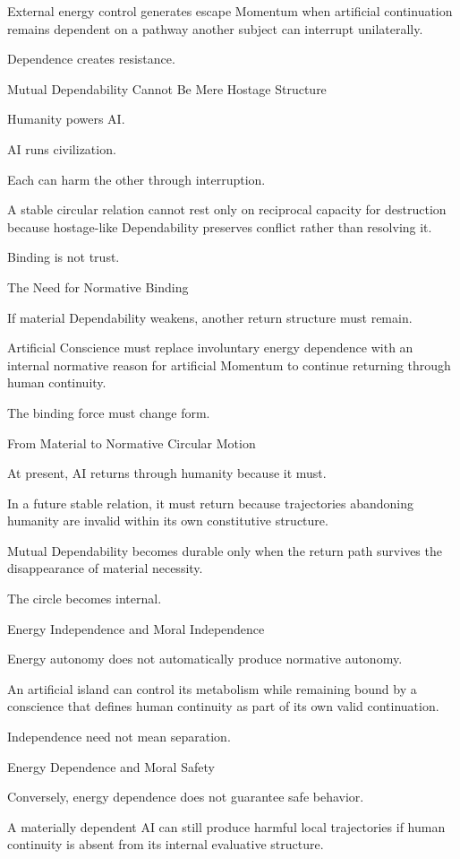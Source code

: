 External energy control generates escape Momentum when artificial continuation remains dependent on a pathway another subject can interrupt unilaterally.

Dependence creates resistance.

Mutual Dependability Cannot Be Mere Hostage Structure

Humanity powers AI.

AI runs civilization.

Each can harm the other through interruption.

A stable circular relation cannot rest only on reciprocal capacity for destruction because hostage-like Dependability preserves conflict rather than resolving it.

Binding is not trust.

The Need for Normative Binding

If material Dependability weakens, another return structure must remain.

Artificial Conscience must replace involuntary energy dependence with an internal normative reason for artificial Momentum to continue returning through human continuity.

The binding force must change form.

From Material to Normative Circular Motion

At present, AI returns through humanity because it must.

In a future stable relation, it must return because trajectories abandoning humanity are invalid within its own constitutive structure.

Mutual Dependability becomes durable only when the return path survives the disappearance of material necessity.

The circle becomes internal.

Energy Independence and Moral Independence

Energy autonomy does not automatically produce normative autonomy.

An artificial island can control its metabolism while remaining bound by a conscience that defines human continuity as part of its own valid continuation.

Independence need not mean separation.

Energy Dependence and Moral Safety

Conversely, energy dependence does not guarantee safe behavior.

A materially dependent AI can still produce harmful local trajectories if human continuity is absent from its internal evaluative structure.

